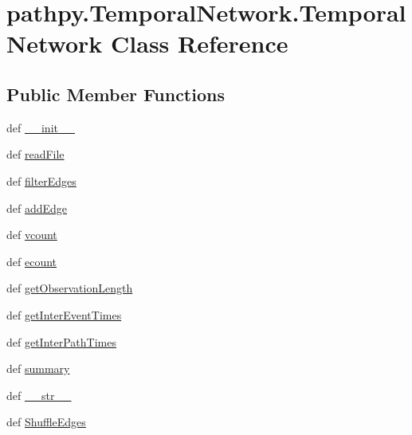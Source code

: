 \hypertarget{classpathpy_1_1TemporalNetwork_1_1TemporalNetwork}{\section{pathpy.\-Temporal\-Network.\-Temporal\-Network Class Reference}
\label{classpathpy_1_1TemporalNetwork_1_1TemporalNetwork}
}
\subsection*{Public Member Functions}
\begin{DoxyCompactItemize}
\item 
def \hyperlink{classpathpy_1_1TemporalNetwork_1_1TemporalNetwork_a778b3b6f649c7057ac1f3f7dc3e43aff}{\-\_\-\-\_\-init\-\_\-\-\_\-}
\item 
def \hyperlink{classpathpy_1_1TemporalNetwork_1_1TemporalNetwork_a54bf4b554d7ca2a45a49cc76a0080cea}{read\-File}
\item 
def \hyperlink{classpathpy_1_1TemporalNetwork_1_1TemporalNetwork_aa1b765e6f119b214d78ba16de3b36cf4}{filter\-Edges}
\item 
def \hyperlink{classpathpy_1_1TemporalNetwork_1_1TemporalNetwork_aac7da90422a66a8123776b3d698b4615}{add\-Edge}
\item 
def \hyperlink{classpathpy_1_1TemporalNetwork_1_1TemporalNetwork_a727ebc2cc2eb2ad8c1ee23cdd5a25b6e}{vcount}
\item 
def \hyperlink{classpathpy_1_1TemporalNetwork_1_1TemporalNetwork_a040f4101e98fb4507709976c2ef7452b}{ecount}
\item 
def \hyperlink{classpathpy_1_1TemporalNetwork_1_1TemporalNetwork_a0ac006ac7818ef042fde95ea90deee80}{get\-Observation\-Length}
\item 
def \hyperlink{classpathpy_1_1TemporalNetwork_1_1TemporalNetwork_a3e43ba8b22586d6f55b2ab28a65bf35b}{get\-Inter\-Event\-Times}
\item 
def \hyperlink{classpathpy_1_1TemporalNetwork_1_1TemporalNetwork_a7a385a1b17104011975aa9c0c3f2912a}{get\-Inter\-Path\-Times}
\item 
def \hyperlink{classpathpy_1_1TemporalNetwork_1_1TemporalNetwork_a39d2b3a872f2a19554ee505393a6f708}{summary}
\item 
def \hyperlink{classpathpy_1_1TemporalNetwork_1_1TemporalNetwork_a0deb7b84090e2667840606ab0eeae509}{\-\_\-\-\_\-str\-\_\-\-\_\-}
\item 
def \hyperlink{classpathpy_1_1TemporalNetwork_1_1TemporalNetwork_a50ea38c4325e1035966c4d2173599a1d}{Shuffle\-Edges}

\end{DoxyCompactItemize}
